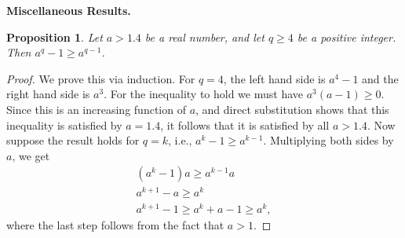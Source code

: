 \documentclass[pdflatex,sn-mathphys-num]{sn-jnl}
\newcommand{\descr}[1]{\vspace{0.2cm} \noindent \textbf{#1}}
\newtheorem{proposition}{Proposition}
\theoremstyle{definition}
\begin{document}
\descr{Miscellaneous Results.}
\begin{proposition}
\label{prop:aq-result}
Let $a > 1.4$ be a real number, and let $q \geq 4$ be a positive integer. Then $a^q - 1 \geq a^{q-1}$.
\end{proposition}
\begin{proof}
We prove this via induction. For $q = 4$, the left hand side is $a^4 - 1$ and the right hand side is $a^3$. For the inequality to hold we must have $a^3(a-1) \geq 0$. Since this is an increasing function of $a$, and direct substitution shows that this inequality is satisfied by $a = 1.4$, it follows that it is satisfied by all $a > 1.4$. 
Now suppose the result holds for $q = k$, i.e., $a^k - 1 \geq a^{k-1}$. Multiplying both sides by $a$, we get
\begin{align*}
    (a^k - 1) a \geq a^{k-1} a\\
    a^{k + 1} - a \geq a^{k} \\
    a^{k + 1} - 1 \geq a^{k} + a - 1 \geq a^k,
\end{align*}
where the last step follows from the fact that $a > 1$.
\end{proof}
\end{document}
